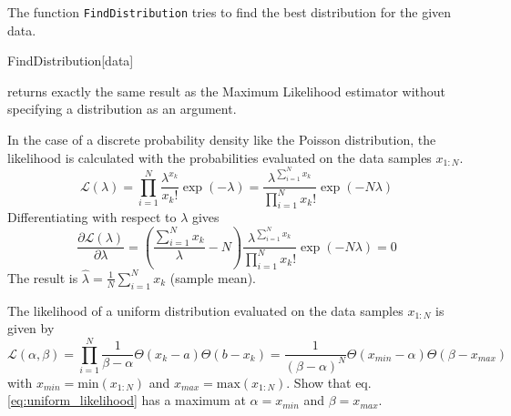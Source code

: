 \documentclass{tstextbook}
\begin{document}
The function \texttt{FindDistribution} tries to find the best distribution for the given data.
\begin{mathematica}
FindDistribution[data]
\end{mathematica}
returns exactly the same result as the Maximum Likelihood estimator without specifying a distribution as an argument.

\begin{example}
In the case of a discrete probability density like the Poisson distribution, the likelihood is calculated with the probabilities evaluated on the data samples $x_{1:N}$.
  \begin{equation}
    \mathcal{L}(\lambda) = \prod_{i=1}^N \frac{\lambda^{x_k}}{x_k!}\exp{(-\lambda)}= \frac{\lambda^{\sum_{i=1}^N x_k}}{\prod_{i=1}^N x_k!}\exp{(-N\lambda)}
  \end{equation}
Differentiating with respect to $\lambda$ gives
  \begin{equation}
    \frac{\partial\mathcal{L}(\lambda)}{\partial\lambda} = \left(\frac{\sum_{i=1}^N x_k}{\lambda} - N\right)\frac{\lambda^{\sum_{i=1}^N x_k}}{\prod_{i=1}^N x_k!} \exp{(-N\lambda)} =0
  \end{equation}
The result is $\hat{\lambda} = \frac{1}{N}\sum_{i=1}^N x_k$ (sample mean).
\end{example}


\begin{exercise}
The likelihood of a uniform distribution evaluated on the data samples $x_{1:N}$ is given by
  \begin{equation}
  \label{eq:uniform_likelihood}
    \mathcal{L}(\alpha,\beta) = \prod_{i=1}^N \frac{1}{\beta-\alpha}\Theta(x_k-a)\Theta(b-x_k)= \frac{1}{(\beta-\alpha)^N}\Theta(x_{min}-\alpha)\Theta(\beta - x_{max})
  \end{equation}
with $x_{min} = \text{min}(x_{1:N})$ and $x_{max} = \text{max}(x_{1:N})$. Show that eq. \ref{eq:uniform_likelihood} has a maximum at $\alpha = x_{min}$ and $\beta = x_{max}$.
\end{exercise}
\end{document}
